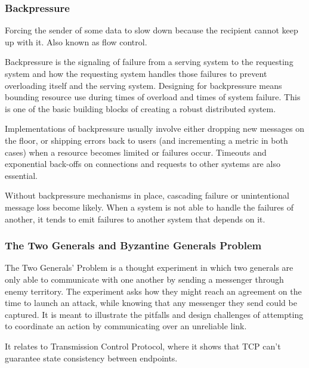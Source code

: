 \documentclass{article}
\begin{document}
    
    \subsubsection{Backpressure}
    Forcing the sender of some data to slow down because the recipient cannot keep up with it. Also known as flow control.
    
    Backpressure is the signaling of failure from a serving system to the requesting system and how the requesting system handles those failures to prevent overloading itself and the serving system. Designing for backpressure means bounding resource use during times of overload and times of system failure. This is one of the basic building blocks of creating a robust distributed system.
    
    Implementations of backpressure usually involve either dropping new messages on the floor, or shipping errors back to users (and incrementing a metric in both cases) when a resource becomes limited or failures occur. Timeouts and exponential back-offs on connections and requests to other systems are also essential.

    Without backpressure mechanisms in place, cascading failure or unintentional message loss become likely. When a system is not able to handle the failures of another, it tends to emit failures to another system that depends on it.
    
    \subsubsection{The Two Generals and Byzantine Generals Problem}
    The Two Generals' Problem is a thought experiment in which two generals are only able to communicate with one another by sending a messenger through enemy territory. The experiment asks how they might reach an agreement on the time to launch an attack, while knowing that any messenger they send could be captured. It is meant to illustrate the pitfalls and design challenges of attempting to coordinate an action by communicating over an unreliable link.
    
    It relates to Transmission Control Protocol, where it shows that TCP can't guarantee state consistency between endpoints.
\end{document}
